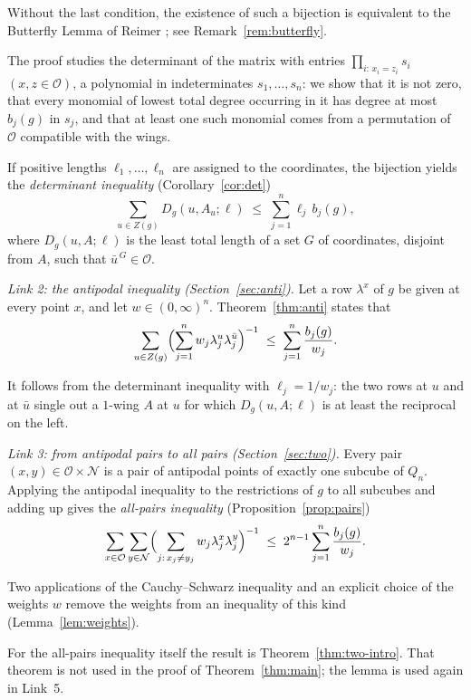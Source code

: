 \documentclass[11pt,reqno]{amsart}
\theoremstyle{definition}
\theoremstyle{remark}
\numberwithin{equation}{section}
\theoremstyle{named}
\theoremstyle{plain}
\newcommand{\cO}{\mathcal{O}}
\newcommand{\cN}{\mathcal{N}}
\begin{document}
Without the last condition, the existence of such a bijection is equivalent to the
Butterfly Lemma of Reimer \cite{Rei}; see Remark~\ref{rem:butterfly}.

The proof studies the
determinant of the matrix with entries
$\prod_{i:\,x_i=z_i}s_i$ $(x,z\in\cO)$, a polynomial in indeterminates $s_1,\dots,s_n$: we show that
it is not zero, that every monomial of lowest total degree occurring in it has degree at most $b_j(g)$
in $s_j$, and that at least one such monomial comes from a permutation of $\cO$ compatible with the
wings.

If positive lengths $\ell_1,\dots,\ell_n$ are assigned to the coordinates, the bijection yields
the \emph{determinant inequality} (Corollary~\ref{cor:det})
\[
   \sum_{u\in Z(g)}D_g(u,A_u;\ell)\;\le\;\sum_{j=1}^{n}\ell_j\,b_j(g),
\]
where $D_g(u,A;\ell)$ is the least total length of a set $G$ of coordinates, disjoint from $A$, such
that $\bar u^{\,G}\in\cO$.

\medskip\noindent\emph{Link 2: the antipodal inequality \textup{(Section~\ref{sec:anti})}.}
Let a row $\lambda^{x}$ of $g$ be given at every point $x$, and let $w\in(0,\infty)^{n}$.
Theorem~\ref{thm:anti} states that
\[
   \sum_{u\in Z(g)}\Bigl(\sum_{j=1}^{n}w_j\lambda^{u}_j\lambda^{\bar u}_j\Bigr)^{-1}
   \;\le\;\sum_{j=1}^{n}\frac{b_j(g)}{w_j}.
\]

It follows from the determinant inequality with $\ell_j=1/w_j$: the two rows at $u$ and at $\bar u$
single out a $1$-wing $A$ at $u$ for which $D_g(u,A;\ell)$ is at least the reciprocal on the left.

\medskip\noindent\emph{Link 3: from antipodal pairs to all pairs
\textup{(Section~\ref{sec:two})}.}
Every pair $(x,y)\in\cO\times\cN$ is a pair of antipodal points of exactly one subcube of $Q_n$.
Applying the antipodal inequality to the restrictions of $g$ to all subcubes and adding up gives the
\emph{all-pairs inequality} (Proposition~\ref{prop:pairs})
\[
   \sum_{x\in\cO}\sum_{y\in\cN}\Bigl(\sum_{j:\,x_j\ne y_j}w_j\lambda^{x}_j\lambda^{y}_j\Bigr)^{-1}
   \;\le\;2^{n-1}\sum_{j=1}^{n}\frac{b_j(g)}{w_j}.
\]

Two applications of the Cauchy--Schwarz inequality and an explicit choice of the weights $w$
remove the weights from an inequality of this kind (Lemma~\ref{lem:weights}).

For the all-pairs
inequality itself the result is Theorem~\ref{thm:two-intro}. That theorem is not used in the
proof of Theorem~\ref{thm:main}; the lemma is used again in Link~5.
\end{document}
